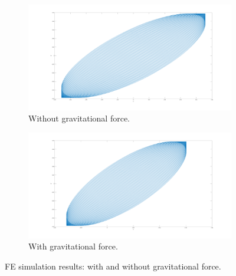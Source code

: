 \documentclass{article}
\begin{document}
\begin{figure}
\centering
    \begin{subfigure}[b]{0.45\textwidth}
        \centering
        \includegraphics[width=\textwidth]{figures/FEA_simu_Orbits_No_grav.png}
        \caption{\small{Without gravitational force.}}
        \label{fig:fea:simres_nograp}
    \end{subfigure}
    \begin{subfigure}[b]{0.45\textwidth}
        \centering
        \includegraphics[width=\textwidth]{figures/FEA_simu_Orbits_With_grav.png}
        \caption{\small{With gravitational force.}}
        \label{fig:fea:simres_withgrav}
    \end{subfigure}
\caption{FE simulation results: with and without gravitational force.}
    \label{fig:fea:simres_gravitational_force_comparison}
\end{figure}
\end{document}
